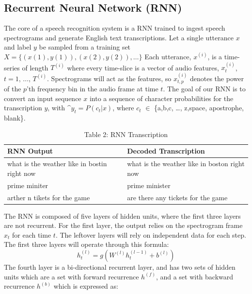 \documentclass[11pt,technote,twocolumn]{IEEEtran}
\begin{document}
\subsection{Recurrent Neural Network (RNN)}
The core of a speech recognition system is a RNN trained to ingest speech spectrograms and generate English text transcriptions. Let a single utterance $x$ and label $y$ be sampled from a training set 
\begin{math}
X = \{(x(1), y(1)),(x(2), y(2)),\ldots\}
\end{math}
Each utterance, $x^{(i)}$, is a time-series of length $T^{(i)}$ where every time-slice is a vector of audio features, $x_t^{(i)}$, $t=1$, $\dots$, $T^{(i)}$. Spectrograms will act as the features, so $x_{t,p}^{(i)}$ denotes the power of the $p$’th frequency bin in the audio frame at time $t$. The goal of our RNN is to convert an input sequence $x$ into a sequence of character probabilities for the transcription $y$, with $\^{y}_t = P(c_t|x)$, where $c_t$ $\in$ \{a,b,c, \ldots, z,space, apostrophe, blank\}. 
\par
\begin{table}[t]
\centering
\begin{tabular}{|l|l|}
\hline
RNN Output                                   & Decoded Transcription                        \\ \hline
what is the weather like in bostin right now & what is the weather like in boston right now \\
prime miniter                                & prime minister                               \\
arther n tikets for the game                 & are there any tickets for the game           \\ \hline
\end{tabular}
\caption*{Table 2: RNN Transcription}
\end{table}
The RNN is composed of five layers of hidden units, where the first three layers are not recurrent. For the first layer, the output relies on the spectrogram frame $x_t$ for each time $t$. The leftover layers will rely on independent data for each step. The first three layers will operate through this formula:
\begin{equation}\tag{3}
    h_t^{(l)} = g(W^{(l)}h_t^{(l-1)}+b^{(l)})
\end{equation}
The fourth layer is a bi-directional recurrent layer, and has two sets of hidden units which are a set with forward recurrence $h^{(f)}$, and a set with backward recurrence $h^{(b)}$ which is expressed as:
\end{document}
